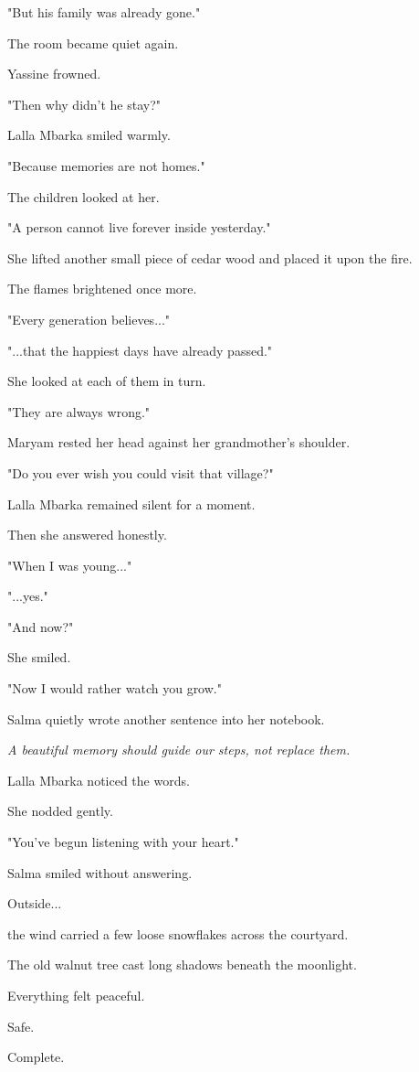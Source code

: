 \documentclass[12pt,openany]{book}
\begin{document}
"But his family was already gone."

The room became quiet again.

Yassine frowned.

"Then why didn't he stay?"

Lalla Mbarka smiled warmly.

"Because memories are not homes."

The children looked at her.

"A person cannot live forever inside yesterday."

She lifted another small piece of cedar wood and placed it upon the fire.

The flames brightened once more.

"Every generation believes..."

"...that the happiest days have already passed."

She looked at each of them in turn.

"They are always wrong."

Maryam rested her head against her grandmother's shoulder.

"Do you ever wish you could visit that village?"

Lalla Mbarka remained silent for a moment.

Then she answered honestly.

"When I was young..."

"...yes."

"And now?"

She smiled.

"Now I would rather watch you grow."

Salma quietly wrote another sentence into her notebook.

\emph{A beautiful memory should guide our steps, not replace them.}

Lalla Mbarka noticed the words.

She nodded gently.

"You've begun listening with your heart."

Salma smiled without answering.

Outside...

the wind carried a few loose snowflakes across the courtyard.

The old walnut tree cast long shadows beneath the moonlight.

Everything felt peaceful.

Safe.

Complete.
\end{document}
